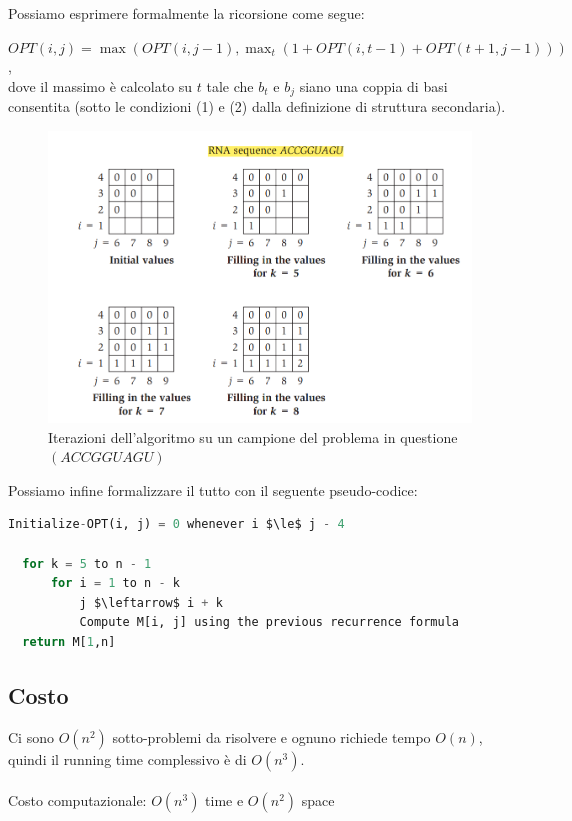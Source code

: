 Possiamo esprimere formalmente la ricorsione come segue:
\\
\begin{myblockquote}
    $OPT(i, j) = \max(OPT(i, j-1), \max_t(1+OPT(i, t-1)+OPT(t+1, j-1)))$,\\
dove il massimo è calcolato su $t$ tale che $b_t$ e
  $b_j$ siano una coppia di basi consentita (sotto le condizioni (1) e
  (2) dalla definizione di struttura secondaria).
\end{myblockquote}



\begin{figure}[H]
  \includegraphics[width=12cm, keepaspectratio]{Programmazione_dinamica/imgs/rna4.png}
  \centering
  \caption{Iterazioni dell'algoritmo su un campione del problema in
    questione $(ACCGGUAGU)$}
\end{figure}


Possiamo infine formalizzare il tutto con il seguente pseudo-codice:

\begin{lstlisting}[language=Python, mathescape=true]
  Initialize-OPT(i, j) = 0 whenever i $\le$ j - 4

  for k = 5 to n - 1 
	  for i = 1 to n - k
		  j $\leftarrow$ i + k
		  Compute M[i, j] using the previous recurrence formula
  return M[1,n]
\end{lstlisting}

\subsection{Costo}

Ci sono $O(n^2)$ sotto-problemi da risolvere e ognuno richiede tempo
$O(n)$, quindi il running time complessivo è di $O(n^3)$.
\\
\\
Costo computazionale: $O(n^3)$ time e $O(n^2)$ space

